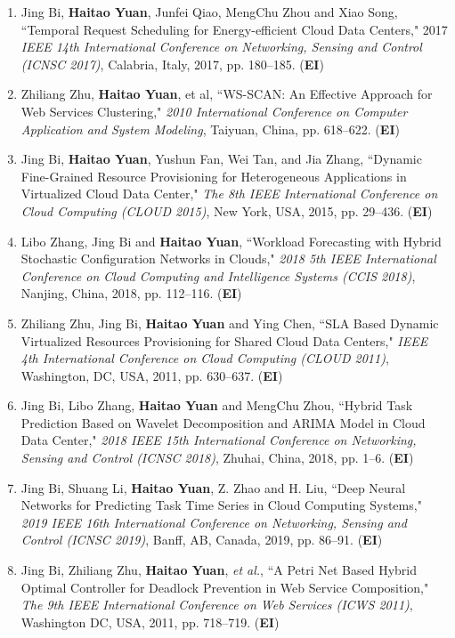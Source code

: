 \documentclass[margin,line]{res}
\begin{document}
\begin{resume}
\begin{enumerate}
\item Jing Bi, \textbf{Haitao Yuan}, Junfei Qiao, MengChu Zhou and Xiao Song, ``Temporal Request Scheduling for Energy-efficient Cloud Data Centers," 2017 \emph{IEEE 14th International Conference on Networking, Sensing and Control (ICNSC 2017)}, Calabria, Italy, 2017, pp. 180--185. (\textbf{EI})
\item Zhiliang Zhu, \textbf{Haitao Yuan}, et al, ``WS-SCAN: An Effective Approach for Web Services Clustering," \emph{2010 International Conference on Computer Application and System Modeling}, Taiyuan, China, pp. 618--622. (\textbf{EI})
\item Jing Bi, \textbf{Haitao Yuan}, Yushun Fan, Wei Tan, and Jia Zhang, ``Dynamic Fine-Grained Resource Provisioning for Heterogeneous Applications in Virtualized Cloud Data Center," \emph{The 8th IEEE International Conference on Cloud Computing (CLOUD 2015)}, New York, USA, 2015, pp. 29--436. (\textbf{EI})
\item Libo Zhang, Jing Bi and \textbf{Haitao Yuan}, ``Workload Forecasting with Hybrid Stochastic Configuration Networks in Clouds," \emph{2018 5th IEEE International Conference on Cloud Computing and Intelligence Systems (CCIS 2018)}, Nanjing, China, 2018, pp. 112--116. (\textbf{EI})
\item Zhiliang Zhu, Jing Bi, \textbf{Haitao Yuan} and Ying Chen, ``SLA Based Dynamic Virtualized Resources Provisioning for Shared Cloud Data Centers," \emph{IEEE 4th International Conference on Cloud Computing (CLOUD 2011)}, Washington, DC, USA, 2011, pp. 630--637. (\textbf{EI})
\item Jing Bi, Libo Zhang, \textbf{Haitao Yuan} and MengChu Zhou, ``Hybrid Task Prediction Based on Wavelet Decomposition and ARIMA Model in Cloud Data Center," \emph{2018 IEEE 15th International Conference on Networking, Sensing and Control (ICNSC 2018)}, Zhuhai, China, 2018, pp. 1--6. (\textbf{EI})
\item Jing Bi, Shuang Li, \textbf{Haitao Yuan}, Z. Zhao and H. Liu, ``Deep Neural Networks for Predicting Task Time Series in Cloud Computing Systems," \emph{2019 IEEE 16th International Conference on Networking, Sensing and Control (ICNSC 2019)}, Banff, AB, Canada, 2019, pp. 86--91. (\textbf{EI})
\item Jing Bi, Zhiliang Zhu, \textbf{Haitao Yuan}, \textit{et al.}, ``A Petri Net Based Hybrid Optimal Controller for Deadlock Prevention in Web Service Composition," \emph{The 9th IEEE International Conference on Web Services (ICWS 2011)}, Washington DC, USA, 2011, pp. 718--719. (\textbf{EI})

\end{enumerate}
\end{resume}
\end{document}
